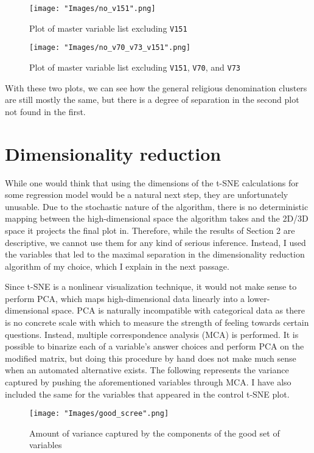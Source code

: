 \documentclass{article}
\begin{document}
	\begin{figure}[h]
		\centering
		\texttt{[image: "Images/no\_v151".png]}
		\caption{Plot of master variable list excluding \texttt{V151}}
	\end{figure}

	\begin{figure}[h]
		\centering
		\texttt{[image: "Images/no\_v70\_v73\_v151".png]}
		\caption{Plot of master variable list excluding \texttt{V151}, \texttt{V70}, and \texttt{V73}}
	\end{figure}

	With these two plots, we can see how the general religious denomination clusters are still mostly the same, but there is a degree of separation in the second plot not found in the first. 

	\section{Dimensionality reduction}
	While one would think that using the dimensions of the t-SNE calculations for some regression model would be a natural next step, they are unfortunately unusable. Due to the stochastic nature of the algorithm, there is no deterministic mapping between the high-dimensional space the algorithm takes and the 2D/3D space it projects the final plot in. Therefore, while the results of Section 2 are descriptive, we cannot use them for any kind of serious inference. Instead, I used the variables that led to the maximal separation in the dimensionality reduction algorithm of my choice, which I explain in the next passage.
	
	Since t-SNE is a nonlinear visualization technique, it would not make sense to perform PCA, which maps high-dimensional data linearly into a lower-dimensional space. PCA is naturally incompatible with categorical data as there is no concrete scale with which to measure the strength of feeling towards certain questions. Instead, multiple correspondence analysis (MCA) is performed. It is possible to binarize each of a variable's answer choices and perform PCA on the modified matrix, but doing this procedure by hand does not make much sense when an automated alternative exists. The following represents the variance captured by pushing the aforementioned variables through MCA. I have also included the same for the variables that appeared in the control t-SNE plot.
	
	\begin{figure}[h]
		\centering
		\texttt{[image: "Images/good\_scree".png]}
		\caption{Amount of variance captured by the components of the good set of variables}
	\end{figure}
	
\end{document}

